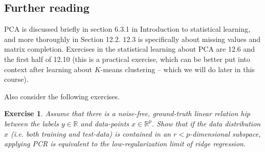 \documentclass{article}
\newcommand{\R}{\mathbb{R}}
\newtheorem{exercise}{Exercise}
\newcommand{\norm}[1]{\Vert #1 \Vert}
\begin{document}

\subsection{Further reading}
PCA is discussed briefly in section 6.3.1 in Introduction to statistical learning, and more thoroughly in Section 12.2. 12.3 is specifically about missing values and matrix completion. Exercises in the statistical learning about PCA are 12.6 and the first half of 12.10 (this is a practical exercise, which can be better put into context after learning about $K$-means clustering -- which we will do later in this course).

Also consider the following exercises.

\begin{exercise}
    Assume that there is a noise-free, ground-truth linear relation hip between the labels $y \in \R$ and data-points $x\in\R^p$. Show that if the data distribution $x$ (i.e. both training and test-data) is contained in an $r<p$-dimensional subspace, applying PCR is equivalent to the low-regularization limit of ridge regression.  
\end{exercise}
\end{document}
